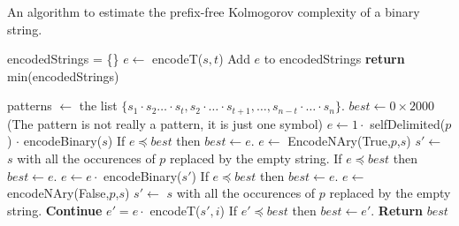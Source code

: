 \documentclass[12pt]{amsart}
\theoremstyle{definition}
\theoremstyle{remark}
\theoremstyle{definition}
\theoremstyle{remark}
\begin{document}
		\begin{algorithm}
			\caption{An algorithm to estimate the prefix-free Kolmogorov complexity of a binary string.}
			\begin{algorithmic}
					\State encodedStrings = \{\} 
						\State $e \gets$ encodeT($s,t$) 
						\State Add $e$ to encodedStrings
					\EndFor
					\State \textbf{return} min(encodedStrings) 
				\EndProcedure

				\State patterns $\gets$ the list $\{s_1 \cdot s_2 \dots \cdot s_t, s_2 \cdot \dots \cdot s_{t+1},\dots,s_{n-t} \cdot \dots \cdot s_n \}$.								 \State $best \gets 0 \times 2000$ 
				 
					 \Comment(The pattern is not really a pattern, it is just one symbol)
						\State $e \gets 1 \cdot $ selfDelimited($p$) $ \cdot $ encodeBinary($s$)
						\State If $e \preceq best$ then $best \gets e$. 
						\Else {}
							\State $e \gets $ EncodeNAry(True,$p$,$s$)
							\State $s' \gets $ $s$ with all the occurences of $p$ replaced by the empty string.
								\State If $e \preceq best$ then $best \gets e$. 
							\Else
								\State $e \gets e \cdot $ encodeBinary($s'$)
								\State If $e \preceq best$ then $best \gets e$. 
							\EndIf
					\EndIf
				\EndFor
					\State $e \gets $ encodeNAry(False,$p$,$s$)
					\State $s' \gets $ $s$ with all the occurences of $p$ replaced by the empty string.
					\State \textbf{Continue}
					\Else
						\State $e' = e \cdot $ encodeT($s',i$)
						\State If $e' \preceq best$ then $best \gets e'$. 
					\EndFor
					\EndIf
				\EndFor
				\textbf{Return} $best$
				\EndFunction
			\end{algorithmic}
		\end{algorithm}

	
	
\end{document}
